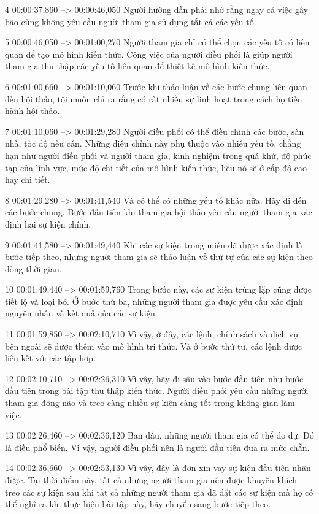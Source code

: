 4
00:00:37,860 --> 00:00:46,050
Người hướng dẫn phải nhớ rằng ngay cả việc gây bão cũng không yêu cầu người tham gia sử dụng tất cả các yếu tố.

5
00:00:46,050 --> 00:01:00,270
Người tham gia chỉ có thể chọn các yếu tố có liên quan để tạo mô hình kiến ​​thức.  Công việc của người điều phối là giúp người tham gia thu thập các yếu tố liên quan để thiết kế mô hình kiến ​​thức.

6
00:01:00,660 --> 00:01:10,060
Trước khi thảo luận về các bước chung liên quan đến hội thảo, tôi muốn chỉ ra rằng có rất nhiều sự linh hoạt trong cách họ tiến hành hội thảo.

7
00:01:10,060 --> 00:01:29,280
Người điều phối có thể điều chỉnh các bước, sàn nhà, tốc độ nếu cần.  Những điều chỉnh này phụ thuộc vào nhiều yếu tố, chẳng hạn như người điều phối và người tham gia, kinh nghiệm trong quá khứ, độ phức tạp của lĩnh vực, mức độ chi tiết của mô hình kiến ​​thức, liệu nó sẽ ở cấp độ cao hay chi tiết.

8
00:01:29,280 --> 00:01:41,540
Và có thể có những yếu tố khác nữa.  Hãy đi đến các bước chung.  Bước đầu tiên khi tham gia hội thảo yêu cầu người tham gia xác định hai sự kiện chính.

9
00:01:41,580 --> 00:01:49,440
Khi các sự kiện trong miền đã được xác định là bước tiếp theo, những người tham gia sẽ thảo luận về thứ tự của các sự kiện theo dòng thời gian.

10
00:01:49,440 --> 00:01:59,760
Trong bước này, các sự kiện trùng lặp cũng được tiết lộ và loại bỏ.  Ở bước thứ ba, những người tham gia được yêu cầu xác định nguyên nhân và kết quả của các sự kiện.

11
00:01:59,850 --> 00:02:10,710
Vì vậy, ở đây, các lệnh, chính sách và dịch vụ bên ngoài sẽ được thêm vào mô hình tri thức.  Và ở bước thứ tư, các lệnh được liên kết với các tập hợp.

12
00:02:10,710 --> 00:02:26,310
Vì vậy, hãy đi sâu vào bước đầu tiên như bước đầu tiên trong bài tập thu thập kiến ​​thức.  Người điều phối yêu cầu những người tham gia động não và treo càng nhiều sự kiện càng tốt trong không gian làm việc.

13
00:02:26,460 --> 00:02:36,120
Ban đầu, những người tham gia có thể do dự.  Đó là điều phổ biến.  Vì vậy, người điều phối nên là người đầu tiên đưa ra mức chẵn.

14
00:02:36,660 --> 00:02:53,130
Vì vậy, đây là đơn xin vay sự kiện đầu tiên nhận được.  Tại thời điểm này, tất cả những người tham gia nên được khuyến khích treo các sự kiện sau khi tất cả những người tham gia đã đặt các sự kiện mà họ có thể nghĩ ra khi thực hiện bài tập này, hãy chuyển sang bước tiếp theo.

